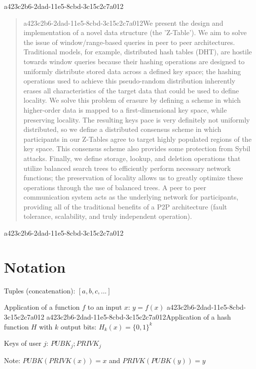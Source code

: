 \documentclass[12pt]{article}
\begin{document}
\maketitle
a423c2b6-2dad-11e5-8cbd-3c15c2c7a012
\begin{abstract}
a423c2b6-2dad-11e5-8cbd-3c15c2c7a012We present the design and implementation of a novel data structure (the 'Z-Table'). We aim to solve the issue of window/range-based queries in peer to peer architectures. Traditional models, for example,  distributed hash tables (DHT), are hostile towards window queries because their hashing operations are designed to uniformly distribute stored data across a defined key space; the hashing operations used to achieve this pseudo-random distribution inherently erases all characteristics of the target data that could be used to define locality. We solve this problem of erasure by defining a scheme in which higher-order data is mapped to a first-dimensional key space, while preserving locality. The resulting keys pace is very definitely not uniformly distributed, so we define a distributed consensus scheme in which participants in our Z-Tables agree to target highly populated regions of the key space. This consensus scheme also provides some protection from Sybil attacks. Finally, we define storage, lookup, and deletion operations that utilize balanced search trees to efficiently perform necessary network functions; the preservation of locality allows us to greatly optimize these operations through the use of balanced trees. A peer to peer communication system acts as the underlying network for participants, providing all of the traditional benefits of a P2P architecture (fault tolerance, scalability, and truly independent operation).
\end{abstract}

a423c2b6-2dad-11e5-8cbd-3c15c2c7a012\section{Notation}

Tuples (concatenation): $[a,b,c,...]$

Application of a function $f$ to an input $x$: $y=f(x)$
a423c2b6-2dad-11e5-8cbd-3c15c2c7a012
a423c2b6-2dad-11e5-8cbd-3c15c2c7a012Application of a hash function $H$ with $k$ output bits: $H_{k}(x) = \{0,1\}^k$

Keys of user $j$: $ PUBK_j; PRIVK_j $

Note: $PUBK(PRIVK(x)) = x$ and $PRIVK(PUBK(y)) = y$~
\end{document}
